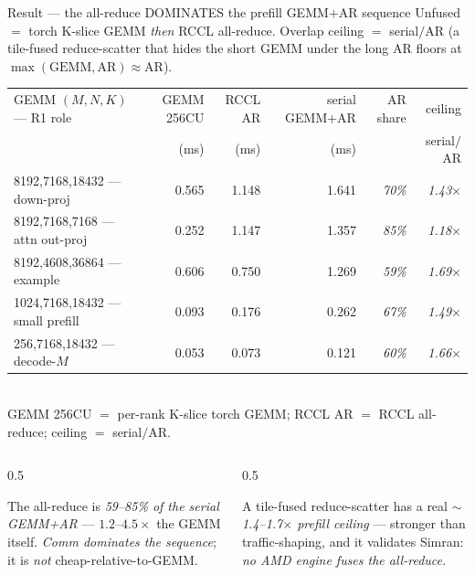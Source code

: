 \documentclass[pdf,aspectratio=169]{beamer}
\newcommand{\empy}[1]{{\color{darkorange}\emph{#1}}}
\newcommand{\empr}[1]{{\color{cardinalred}\emph{#1}}}
\newcommand{\examplebox}[2]{%
\begin{tcolorbox}[colframe=darkcardinal,colback=boxgray,title={#1}]
#2
\end{tcolorbox}}
\newcommand{\mc}[1]{{\ttfamily\small #1}}
\begin{document}
\begin{frame}{Result --- the all-reduce DOMINATES the prefill GEMM$+$AR sequence}
\footnotesize
Unfused $=$ torch K-slice GEMM \emph{then} RCCL all-reduce. Overlap ceiling $=$ serial$/$AR (a tile-fused reduce-scatter that hides the short GEMM under the long AR floors at $\max(\text{GEMM},\text{AR})\!\approx\!\text{AR}$).
\begin{center}
\scriptsize\setlength{\tabcolsep}{3.5pt}
\begin{tabular}{l r r r r r}
\toprule
GEMM $(M,N,K)$ --- R1 role & GEMM 256CU & RCCL AR & serial GEMM+AR & AR share & ceiling \\
 & (ms) & (ms) & (ms) & & serial$/$AR \\
\midrule
\mc{8192,7168,18432} --- down-proj      & 0.565 & 1.148 & 1.641 & \empr{70\%} & \empy{1.43$\times$} \\
\mc{8192,7168,7168}  --- attn out-proj  & 0.252 & 1.147 & 1.357 & \empr{85\%} & \empy{1.18$\times$} \\
\mc{8192,4608,36864} --- example        & 0.606 & 0.750 & 1.269 & \empr{59\%} & \empy{1.69$\times$} \\
\mc{1024,7168,18432} --- small prefill  & 0.093 & 0.176 & 0.262 & \empr{67\%} & \empy{1.49$\times$} \\
\mc{256,7168,18432}  --- decode-$M$     & 0.053 & 0.073 & 0.121 & \empr{60\%} & \empy{1.66$\times$} \\
\bottomrule
\end{tabular}\\
\scriptsize GEMM 256CU $=$ per-rank K-slice torch GEMM; RCCL AR $=$ RCCL all-reduce; ceiling $=$ serial$/$AR.
\end{center}
\vspace{0.3ex}
\begin{columns}
\begin{column}{0.5\textwidth}
\examplebox{The reading}{\footnotesize
The all-reduce is \empr{59--85\% of the serial GEMM+AR} --- $1.2$--$4.5\times$ the GEMM itself. \empy{Comm dominates the sequence}; it is \emph{not} cheap-relative-to-GEMM.}
\end{column}
\begin{column}{0.5\textwidth}
\examplebox{The lever}{\footnotesize
A tile-fused reduce-scatter has a real \empr{$\sim$1.4--1.7$\times$ prefill ceiling} --- stronger than traffic-shaping, and it validates Simran: \empy{no AMD engine fuses the all-reduce.}}
\end{column}
\end{columns}
\end{frame}
\end{document}
